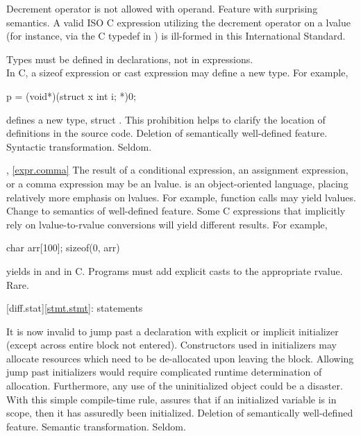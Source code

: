 \change
Decrement operator is not allowed with  operand.
\rationale Feature with surprising semantics.
\effect A valid ISO C expression utilizing the decrement operator on
a  lvalue (for instance, via the C typedef in )
is ill-formed in this International Standard.

\change Types must be defined in declarations, not in expressions.\\
In C, a sizeof expression or cast expression may define a new type.
For example,
\begin{codeblock}
p = (void*)(struct x {int i;} *)0;
\end{codeblock}
defines a new type, struct .
\rationale
This prohibition helps to clarify the location of
definitions in the source code.
\effect
Deletion of semantically well-defined feature.
\difficulty
Syntactic transformation.
\howwide
Seldom.

, \ref{expr.comma}
%
%
%
\change The result of a conditional expression, an assignment expression, or a comma expression may be an lvalue.
\rationale
\Cpp{} is an object-oriented language, placing relatively
more emphasis on lvalues.  For example, function calls may
yield lvalues.
\effect
Change to semantics of well-defined feature.  Some C
expressions that implicitly rely on lvalue-to-rvalue
conversions will yield different results.  For example,

\begin{codeblock}
char arr[100];
sizeof(0, arr)
\end{codeblock}

yields
in \Cpp{} and
in C.
\difficulty
Programs must add explicit casts to the appropriate rvalue.
\howwide
Rare.

[diff.stat]{\ref{stmt.stmt}: statements}

\change It is now invalid to jump past a declaration with explicit or implicit initializer (except across entire block not entered).
\rationale
Constructors used in initializers may allocate
resources which need to be de-allocated upon leaving the
block.
Allowing jump past initializers would require
complicated runtime determination of allocation.
Furthermore, any use of the uninitialized object could be a
disaster.
With this simple compile-time rule, \Cpp{} assures that
if an initialized variable is in scope, then it has assuredly been
initialized.
\effect
Deletion of semantically well-defined feature.
\difficulty
Semantic transformation.
\howwide
Seldom.

